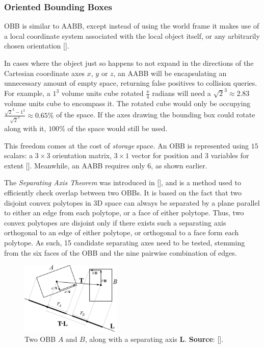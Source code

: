 

\subsubsection{Oriented Bounding Boxes}
\gls{OBB} is similar to \gls{AABB}, except instead of using the world frame it makes use of a local coordinate system associated with the local object itself, or any arbitrarily chosen orientation [\citeauthor{VanDenBergen1998}]. 

In cases where the object just so happens to not expand in the directions of the Cartesian coordinate axes $x$, $y$ or $z$, an \gls{AABB} will be encapsulating an unnecessary amount of empty space, returning false positives to collision queries. For example, a $1^3$ volume units cube rotated $\frac{\pi}{4}$ radians will need a $\sqrt{2}^3\approx 2.83$ volume units cube to encompass it. The rotated cube would only be occupying $\frac{\sqrt{2}^3 - 1^3}{\sqrt{2}^3} \approx 0.65\%$ of the space. If the axes drawing the bounding box could rotate along with it, $100\%$ of the space would still be used.

This freedom comes at the cost of \textit{storage} space. An \gls{OBB} is represented using $15$ scalars: a $3 \times 3$ orientation matrix, $3 \times 1$ vector for position and $3$ variables for extent [\citeauthor{VanDenBergen1998}]. Meanwhile, an \gls{AABB} requires only $6$, as shown earlier.

The \textit{Separating Axis Theorem} was introduced in [\citeauthor{Gottschalk1996}], and is a method used to efficiently check overlap between two \gls{OBB}s. It is based on the fact that two disjoint convex polytopes in 3D space can always be separated by a plane parallel to either an edge from each polytope, or a face of either polytope. Thus, two convex polytopes are disjoint only if there exists such a separating axis orthogonal to an edge of either polytope, or orthogonal to a face form each polytope. As such, 15 candidate separating axes need to be tested, stemming from the six faces of the \gls{OBB} and the nine pairwise combination of edges. 

\begin{figure}[h]
	\centering
	\includegraphics[width=0.43\textwidth]{import/OBB_sepaxis.png}
	\caption{Two OBB $A$ and $B$, along with a separating axis $\textbf{L}$. \textbf{Source}: [\citeauthor{Gottschalk1996}].}
	\label{fig:OBB_sepaxis}
\end{figure}


